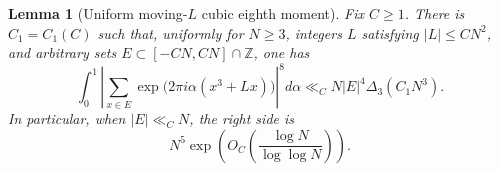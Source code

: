 \documentclass[11pt,reqno]{amsart}
\newtheorem{lemma}[theorem]{Lemma}
\theoremstyle{definition}
\theoremstyle{remark}
\begin{document}
\begin{lemma}[Uniform moving-$L$ cubic eighth moment]
\label{lem:uniform-moving-cubic}
Fix $C\geq1$.  There is $C_1=C_1(C)$ such that, uniformly for $N\geq3$,
integers $L$ satisfying $|L|\leq CN^2$, and arbitrary sets
$E\subset[-CN,CN]\cap\mathbb Z$, one has
\begin{equation}\label{eq:uniform-moving-cubic}
 \int_0^1\left|
  \sum_{x\in E}\exp\bigl(2\pi i\alpha(x^3+Lx)\bigr)
 \right|^8d\alpha
 \ll_C N|E|^4\Delta_3(C_1N^3).
\end{equation}
In particular, when $|E|\ll_C N$, the right side is
\begin{equation}\label{eq:uniform-moving-cubic-maxorder}
 N^5\exp\!\left(O_C\!\left(
  \frac{\log N}{\log\log N}\right)\right).
\end{equation}
\end{lemma}
\end{document}
